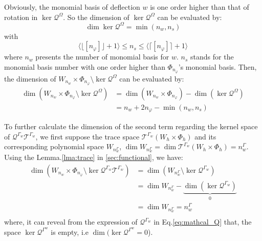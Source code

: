 Obviously, the monomial basis of deflection $w$ is one order higher than that of rotation in $\ker \mathcal Q^\Omega$.
So the dimension of $\ker \mathcal Q^\Omega$ can be evaluated by:
\begin{equation}
\dim \ker \mathcal Q^\Omega = \min (n_w,n_s)
\end{equation}
with
\begin{equation}
\langle \lfloor [n_\varphi] \rfloor+1 \rangle \le n_s \le \langle \lceil[n_\varphi]\rceil + 1 \rangle
\end{equation}
where $n_w$ presents the number of monomial basis for $w$. $n_s$ stands for the monomial basis number with one order higher than $\Phi_{n_\varphi}$'s monomial basis.
Then, the dimension of $W_{n_w}\times\Phi_{n_\varphi}\setminus\ker \mathcal Q^\Omega$ can be evaluated by: 
\begin{equation}\label{eq:dim_relation_8}
    \begin{split}
        \dim\left(W_{n_w}\times\Phi_{n_\varphi}\setminus\ker \mathcal Q^\Omega\right) &= \dim\left(W_{n_w}\times\Phi_{n_\varphi}\right) - \dim\left(\ker \mathcal Q^\Omega\right) \\
        &=n_w + 2n_\varphi - \min (n_w,n_s)
    \end{split}
\end{equation}

To further calculate the dimension of the second term regarding the kernel space of $\mathcal Q^{\Gamma_w}\mathcal T^{\Gamma_w}$, we first suppose the trace space $\mathcal T^{\Gamma_w}(W_h\times\Phi_h)$ and its corresponding polynomial space $W_{n_w^\Gamma}$, $\dim W_{n_w^\Gamma}=\dim \mathcal T^{\Gamma_w}(W_h\times\Phi_h)=n_w^\Gamma$.
Using the Lemma.\ref{lma:trace} in \ref{sec:functional}, we have:
\begin{equation}\label{eq:dim_relation_9}
    \begin{split}
        \dim\left(W_{n_w}\times\Phi_{n_\varphi}\setminus\ker\mathcal Q^{\Gamma_w}\mathcal T^{\Gamma_w}\right)
        &= \dim \left(W_{n_w^\Gamma}\setminus \ker \mathcal Q^{\Gamma_w}\right) \\
        &= \dim W_{n_w^\Gamma} - \underbrace{\dim \left( \ker \mathcal Q^{\Gamma_w}\right)}_0 \\
        &= \dim W_{n_w^\Gamma} = n_w^\Gamma \\
    \end{split}
\end{equation}
where, it can reveal from the expression of $\mathcal Q^{\Gamma_w}$ in Eq.\eqref{eq:mathcal_Q} that, the space $\ker \mathcal Q^{\Gamma^w}$ is empty, i.e $\dim(\ker \mathcal Q^{\Gamma^w} = 0$). 

